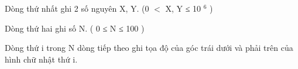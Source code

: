 Dòng thứ nhất ghi 2 số nguyên X, Y. (0 $<$ X, Y ≤ 10   $^    6   $   )  

   Dòng thứ hai ghi số N. ( 0 ≤ N ≤ 100 )  

   Dòng thứ i trong N dòng tiếp theo ghi tọa độ của góc trái dưới và phải trên của hình chữ nhật thứ i.  

\